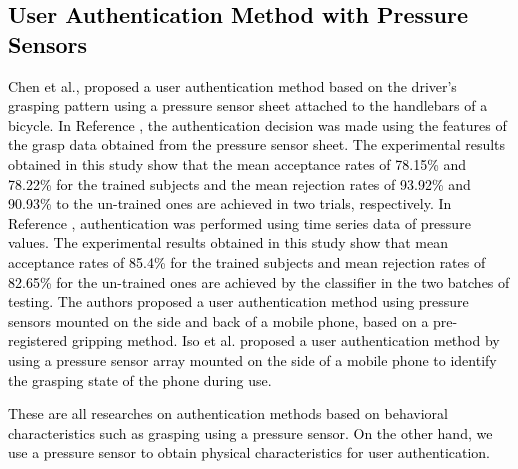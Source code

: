 \documentclass[english,preprint,JIP]{ipsj}
\begin{document}
\textcolor{black}{
\subsection{User Authentication Method with Pressure Sensors}
Chen et al.\cite{driver_handgrip_1}, \cite{driver_handgrip_2} proposed a user authentication method based on the driver's grasping pattern using a pressure sensor sheet attached to the handlebars of a bicycle. In Reference \cite{driver_handgrip_1}, the authentication decision was made using the features of the grasp data obtained from the pressure sensor sheet. The experimental results obtained in this study show that the mean acceptance rates of 78.15\% and 78.22\% for the trained subjects and the mean rejection rates of 93.92\% and 90.93\% to the un-trained ones are achieved in two trials, respectively. In Reference \cite{driver_handgrip_2}, authentication was performed using time series data of pressure values. The experimental results obtained in this study show that mean acceptance rates of 85.4\% for the trained subjects and mean rejection rates of 82.65\% for the un-trained ones are achieved by the classifier in the two batches of testing. The authors proposed a user authentication method using pressure sensors mounted on the side and back of a mobile phone, based on a pre-registered gripping method\cite{murao_grip}. Iso et al.\cite{mobile_grip} proposed a user authentication method by using a pressure sensor array mounted on the side of a mobile phone to identify the grasping state of the phone during use.}\par

\textcolor{black}{These are all researches on authentication methods based on behavioral characteristics such as grasping using a pressure sensor. On the other hand, we use a pressure sensor to obtain physical characteristics for user authentication.}


\end{document}
